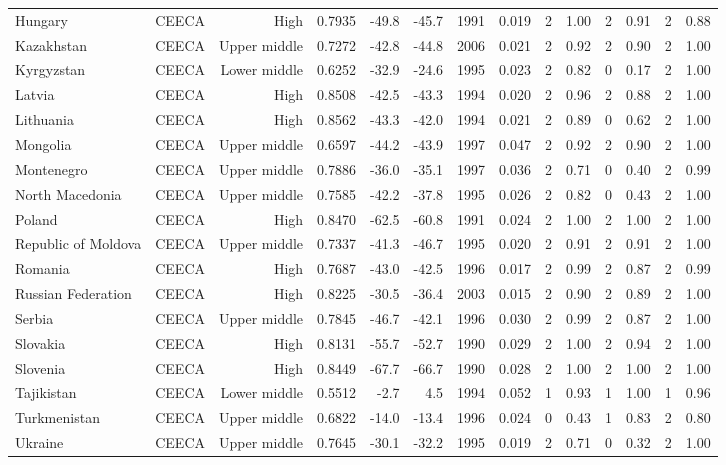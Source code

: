 \begin{longtable}{llrrrrrrrrrrrr}
Hungary & CEECA & High & 0.7935 & -49.8 & -45.7 & 1991 & 0.019 & 2 & 1.00 & 2 & 0.91 & 2 & 0.88 \\
Kazakhstan & CEECA & Upper middle & 0.7272 & -42.8 & -44.8 & 2006 & 0.021 & 2 & 0.92 & 2 & 0.90 & 2 & 1.00 \\
Kyrgyzstan & CEECA & Lower middle & 0.6252 & -32.9 & -24.6 & 1995 & 0.023 & 2 & 0.82 & 0 & 0.17 & 2 & 1.00 \\
Latvia & CEECA & High & 0.8508 & -42.5 & -43.3 & 1994 & 0.020 & 2 & 0.96 & 2 & 0.88 & 2 & 1.00 \\
Lithuania & CEECA & High & 0.8562 & -43.3 & -42.0 & 1994 & 0.021 & 2 & 0.89 & 0 & 0.62 & 2 & 1.00 \\
Mongolia & CEECA & Upper middle & 0.6597 & -44.2 & -43.9 & 1997 & 0.047 & 2 & 0.92 & 2 & 0.90 & 2 & 1.00 \\
Montenegro & CEECA & Upper middle & 0.7886 & -36.0 & -35.1 & 1997 & 0.036 & 2 & 0.71 & 0 & 0.40 & 2 & 0.99 \\
North Macedonia & CEECA & Upper middle & 0.7585 & -42.2 & -37.8 & 1995 & 0.026 & 2 & 0.82 & 0 & 0.43 & 2 & 1.00 \\
Poland & CEECA & High & 0.8470 & -62.5 & -60.8 & 1991 & 0.024 & 2 & 1.00 & 2 & 1.00 & 2 & 1.00 \\
Republic of Moldova & CEECA & Upper middle & 0.7337 & -41.3 & -46.7 & 1995 & 0.020 & 2 & 0.91 & 2 & 0.91 & 2 & 1.00 \\
Romania & CEECA & High & 0.7687 & -43.0 & -42.5 & 1996 & 0.017 & 2 & 0.99 & 2 & 0.87 & 2 & 0.99 \\
Russian Federation & CEECA & High & 0.8225 & -30.5 & -36.4 & 2003 & 0.015 & 2 & 0.90 & 2 & 0.89 & 2 & 1.00 \\
Serbia & CEECA & Upper middle & 0.7845 & -46.7 & -42.1 & 1996 & 0.030 & 2 & 0.99 & 2 & 0.87 & 2 & 1.00 \\
Slovakia & CEECA & High & 0.8131 & -55.7 & -52.7 & 1990 & 0.029 & 2 & 1.00 & 2 & 0.94 & 2 & 1.00 \\
Slovenia & CEECA & High & 0.8449 & -67.7 & -66.7 & 1990 & 0.028 & 2 & 1.00 & 2 & 1.00 & 2 & 1.00 \\
Tajikistan & CEECA & Lower middle & 0.5512 &  -2.7 &   4.5 & 1994 & 0.052 & 1 & 0.93 & 1 & 1.00 & 1 & 0.96 \\
Turkmenistan & CEECA & Upper middle & 0.6822 & -14.0 & -13.4 & 1996 & 0.024 & 0 & 0.43 & 1 & 0.83 & 2 & 0.80 \\
Ukraine & CEECA & Upper middle & 0.7645 & -30.1 & -32.2 & 1995 & 0.019 & 2 & 0.71 & 0 & 0.32 & 2 & 1.00 \\

\end{longtable}
